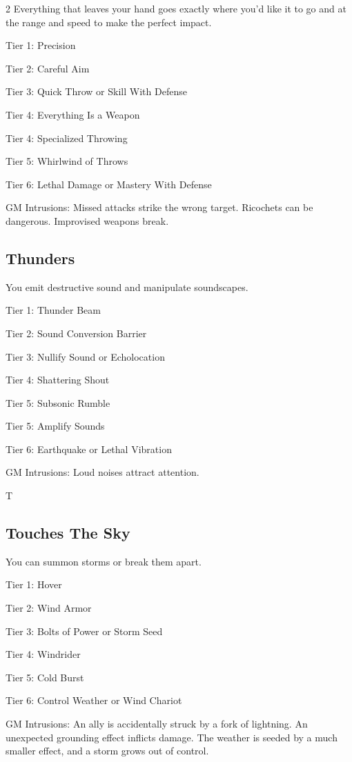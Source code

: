 \begin{multicols}{2}
Everything that leaves your hand goes exactly where you’d like it to go and at the range and speed to make the perfect impact.

Tier 1: Precision

Tier 2: Careful Aim

Tier 3: Quick Throw or Skill With Defense

Tier 4: Everything Is a Weapon

Tier 4: Specialized Throwing

Tier 5: Whirlwind of Throws

Tier 6: Lethal Damage or Mastery With Defense

GM Intrusions: Missed attacks strike the wrong target. Ricochets can be dangerous. Improvised weapons break.

\subsection{Thunders}

You emit destructive sound and manipulate soundscapes.

Tier 1: Thunder Beam

Tier 2: Sound Conversion Barrier 

Tier 3: Nullify Sound or Echolocation

Tier 4: Shattering Shout

Tier 5: Subsonic Rumble

Tier 5: Amplify Sounds

Tier 6: Earthquake or Lethal Vibration 

GM Intrusions: Loud noises attract attention.

T\subsection{Touches The Sky}

You can summon storms or break them apart.

Tier 1: Hover 

Tier 2: Wind Armor 

Tier 3: Bolts of Power or Storm Seed

Tier 4: Windrider 

Tier 5: Cold Burst 

Tier 6: Control Weather or Wind Chariot 

GM Intrusions: An ally is accidentally struck by a fork of lightning. An unexpected grounding effect inflicts damage. The weather is seeded by a much smaller effect, and a storm grows out of control.


\end{multicols}
